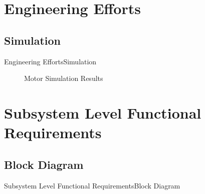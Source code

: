 \documentclass{beamer}
\begin{document}

\section{Engineering Efforts}

\subsection{Simulation}

\begin{frame}{Engineering Efforts}{Simulation}
  \begin{figure}
      \label{fig:Motor Simulation Results}
      \caption{Motor Simulation Results}
\end{figure}
\end{frame}


\section{Subsystem Level Functional Requirements}
\subsection{Block Diagram}
\begin{frame}{Subsystem Level Functional Requirements}{Block Diagram}
\begin{figure}
      \label{fig:House HVAC Model}
\end{figure}
\end{frame}
\end{document}
